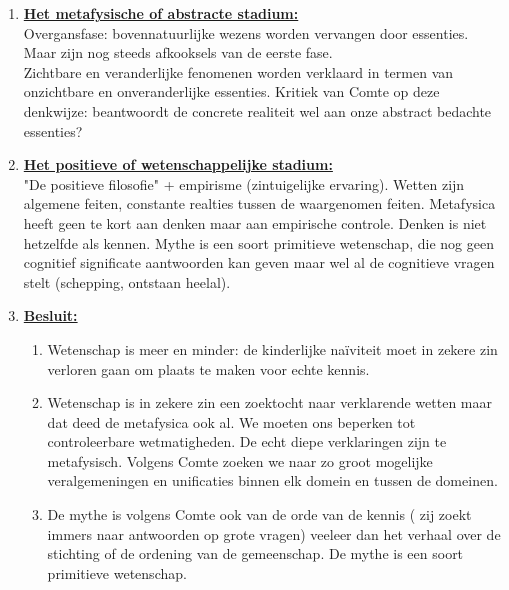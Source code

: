\documentclass[11pt,a4paper]{article}
\begin{document}
\begin{enumerate}
\begin{enumerate}
\end{enumerate}
\item \underline{\textbf{Het metafysische of abstracte stadium:}}\\
Overgansfase: bovennatuurlijke wezens worden vervangen door essenties. Maar zijn nog steeds afkooksels van de eerste fase.\\
Zichtbare en veranderlijke fenomenen worden verklaard in termen van onzichtbare en onveranderlijke essenties. 
Kritiek van Comte op deze denkwijze: beantwoordt de concrete realiteit wel aan onze abstract bedachte essenties?
\item \underline{\textbf{Het positieve of wetenschappelijke stadium:}}\\
"De positieve filosofie" + empirisme (zintuigelijke ervaring). Wetten zijn algemene feiten, constante realties tussen de waargenomen feiten. Metafysica heeft geen te kort aan denken maar aan empirische controle. Denken is niet hetzelfde als kennen.  Mythe is een soort primitieve wetenschap, die nog geen cognitief significate aantwoorden kan geven maar wel al de cognitieve vragen stelt (schepping, ontstaan heelal).
\item[] \underline{\textbf{Besluit:}}
\begin{enumerate}
\item Wetenschap is meer en minder: de kinderlijke naïviteit moet in zekere zin verloren gaan om plaats te maken voor echte kennis.
\item Wetenschap is in zekere zin een zoektocht naar verklarende wetten maar dat deed de metafysica ook al. We moeten ons beperken tot controleerbare wetmatigheden. De echt diepe verklaringen zijn te metafysisch.
Volgens Comte zoeken we naar zo groot mogelijke veralgemeningen en unificaties binnen elk domein en tussen de domeinen.
\item De mythe is volgens Comte ook van de orde van de kennis ( zij zoekt immers naar antwoorden op grote vragen) veeleer dan het verhaal over de stichting of de ordening van de gemeenschap. De mythe is een soort primitieve wetenschap.
\end{enumerate}
\end{enumerate}
\end{document}
